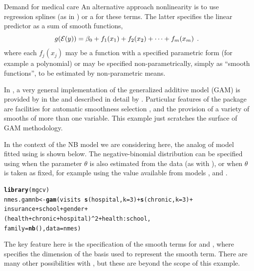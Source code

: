 \documentclass[11pt]{book}\usepackage[]{graphicx}\usepackage[]{color}
\makeatletter
\newcommand{\hlnum}[1]{\textcolor[rgb]{0.686,0.059,0.569}{#1}}%
\newcommand{\hlopt}[1]{\textcolor[rgb]{0,0,0}{#1}}%
\newcommand{\hlstd}[1]{\textcolor[rgb]{0.345,0.345,0.345}{#1}}%
\newcommand{\hlkwb}[1]{\textcolor[rgb]{0.69,0.353,0.396}{#1}}%
\newcommand{\hlkwc}[1]{\textcolor[rgb]{0.333,0.667,0.333}{#1}}%
\newcommand{\hlkwd}[1]{\textcolor[rgb]{0.737,0.353,0.396}{\textbf{#1}}}%
\newenvironment{kframe}{%
 \def\at@end@of@kframe{}%
 \ifinner\ifhmode%
  \def\at@end@of@kframe{\end{minipage}}%
  \begin{minipage}{\columnwidth}%
 \fi\fi%
 \def\FrameCommand##1{\hskip\@totalleftmargin \hskip-\fboxsep
 \colorbox{shadecolor}{##1}\hskip-\fboxsep
     \hskip-\linewidth \hskip-\@totalleftmargin \hskip\columnwidth}%
 \MakeFramed {\advance\hsize-\width
   \@totalleftmargin\z@ \linewidth\hsize
   \@setminipage}}%
 {\par\unskip\endMakeFramed%
 \at@end@of@kframe}
\newenvironment{knitrout}{}{} %
\renewenvironment{knitrout}{\small\renewcommand{\baselinestretch}{.85}}{} %
\makeatother
\begin{document}
\begin{Example}[nmes3]{Demand for medical care}
An alternative approach nonlinearity is to use 
regression splines
(as in ) or a  \citep{HastieTibshirani:1990}
for these terms.  The latter specifies the linear predictor as a sum of
smooth functions,
\begin{equation*}
g(\mathcal{E}(y))=\beta_0 + f_1(x_1) + f_2(x_2)+ \cdots + f_m(x_m) \:\: .
\end{equation*}
where each $f_j(x_j)$ 
may be a function with a specified parametric form (for example a polynomial) 
or may be specified non-parametrically, simply as ``smooth functions'', to be estimated by non-parametric means. 

In \R, a very general implementation of the generalized additive model (GAM) is provided by
 in the  and described in detail by \citet{Wood:2006}.
Particular features of the package are facilities for automatic smoothness selection \citep{Wood:2004},
and the provision of a variety of smooths of more than one variable. This example just
scratches the surface of GAM methodology.

In the context of the NB model we are considering here, the analog of model  
fitted using  is  shown below.  The negative-binomial distribution
can be specified using  when the parameter $\theta$ is also estimated from
the data (as with ), or  when $\theta$ is taken as
fixed,
for example using
the value  available from models , and .
\begin{knitrout}
\color{fgcolor}\begin{kframe}
\begin{alltt}
\hlkwd{library}\hlstd{(mgcv)}
\hlstd{nmes.gamnb} \hlkwb{<-} \hlkwd{gam}\hlstd{(visits} \hlopt{~} \hlkwd{s}\hlstd{(hospital,} \hlkwc{k}\hlstd{=}\hlnum{3}\hlstd{)} \hlopt{+} \hlkwd{s}\hlstd{(chronic,} \hlkwc{k}\hlstd{=}\hlnum{3}\hlstd{)} \hlopt{+}
                           \hlstd{insurance} \hlopt{+} \hlstd{school} \hlopt{+} \hlstd{gender} \hlopt{+}
                           \hlstd{(health}\hlopt{+}\hlstd{chronic}\hlopt{+}\hlstd{hospital)}\hlopt{^}\hlnum{2} \hlopt{+} \hlstd{health}\hlopt{:}\hlstd{school,}
                  \hlkwc{family}\hlstd{=}\hlkwd{nb}\hlstd{(),} \hlkwc{data} \hlstd{= nmes)}
\end{alltt}
\end{kframe}
\end{knitrout}
The key feature here is the specification of the smooth terms for 
and , where  specifies
the dimension of the basis used to represent the smooth term.  There are many other
possibilities with , but these are beyond the scope of this example.


\end{Example}
\end{document}
